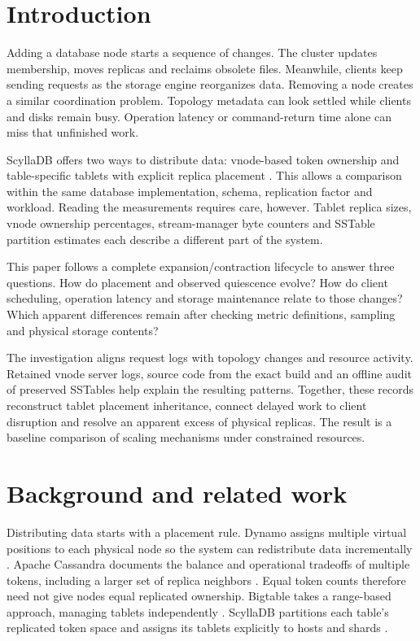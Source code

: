 \hypertarget{introduction}{%
\section{Introduction}\label{introduction}}

Adding a database node starts a sequence of changes. The cluster updates membership, moves replicas and reclaims obsolete files. Meanwhile, clients keep sending requests as the storage engine reorganizes data. Removing a node creates a similar coordination problem. Topology metadata can look settled while clients and disks remain busy. Operation latency or command-return time alone can miss that unfinished work.

ScyllaDB offers two ways to distribute data: vnode-based token ownership and table-specific tablets with explicit replica placement \cite{r1,r6}. This allows a comparison within the same database implementation, schema, replication factor and workload. Reading the measurements requires care, however. Tablet replica sizes, vnode ownership percentages, stream-manager byte counters and SSTable partition estimates each describe a different part of the system.

This paper follows a complete expansion/contraction lifecycle to answer three questions. How do placement and observed quiescence evolve? How do client scheduling, operation latency and storage maintenance relate to those changes? Which apparent differences remain after checking metric definitions, sampling and physical storage contents?

The investigation aligns request logs with topology changes and resource activity. Retained vnode server logs, source code from the exact build and an offline audit of preserved SSTables help explain the resulting patterns. Together, these records reconstruct tablet placement inheritance, connect delayed work to client disruption and resolve an apparent excess of physical replicas. The result is a baseline comparison of scaling mechanisms under constrained resources.

\hypertarget{background-and-related-work}{%
\section{Background and related
work}\label{background-and-related-work}}

Distributing data starts with a placement rule. Dynamo assigns multiple virtual positions to each physical node so the system can redistribute data incrementally \cite{r24}. Apache Cassandra documents the balance and operational tradeoffs of multiple tokens, including a larger set of replica neighbors \cite{r29}. Equal token counts therefore need not give nodes equal replicated ownership. Bigtable takes a range-based approach, managing tablets independently \cite{r25}. ScyllaDB partitions each table's replicated token space and assigns its tablets explicitly to hosts and shards \cite{r1}.

